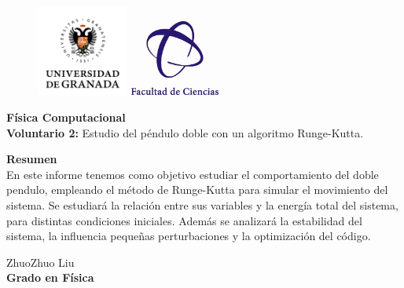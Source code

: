 \documentclass[11pt, twoside]{article} %
\begin{document}
\begin{figure}[h!]
	\includegraphics[width=3cm]{Icons/ugr.jpg}
	\endminipage
	\includegraphics[height = 2.5cm, width=3cm]{Icons/facultad_ciencias.png}
	\endminipage
\end{figure}

\vspace{0.3cm}

\begin{center}
    \Huge \textbf{Física Computacional}\\
    		\vspace{0.4cm}
    \LARGE \textbf{Voluntario 2:}  
    Estudio del péndulo doble con un algoritmo Runge-Kutta.
\end{center}

\vspace{1cm}

\vspace{1cm}

\begin{center}
    \large \textbf{Resumen}\\
    		\vspace{0.2cm}
    \normalsize
    En este informe tenemos como objetivo estudiar el comportamiento del 
    doble pendulo, empleando el método de Runge-Kutta para simular el
    movimiento del sistema. Se estudiará la relación entre sus variables
    y la energía total del sistema, para distintas condiciones iniciales.
    Además se analizará la estabilidad del sistema, la influencia pequeñas 
    perturbaciones y la optimización del código.

\end{center}

\vspace{1cm}

\begin{flushright}
    \large ZhuoZhuo Liu 
    \\
    \vspace{0.4cm}
    \textbf{Grado en Física}
\end{flushright}
\end{document}
